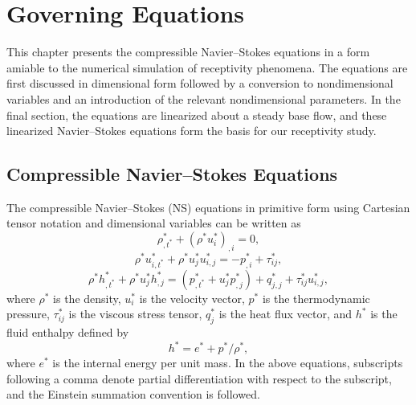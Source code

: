 %
%
%
%
%
\chapter{Governing Equations \label{c:eqn}}

This chapter presents the compressible Navier--Stokes equations in a form
amiable to the numerical simulation of receptivity phenomena.  The equations
are first discussed in dimensional form followed by a conversion to
nondimensional variables and an introduction of the relevant nondimensional
parameters.  In the final section, the equations are linearized about a steady
base flow, and these linearized Navier--Stokes equations form the basis for our
receptivity study.

\section{Compressible Navier--Stokes Equations \label{s:deqn}}

The compressible Navier--Stokes (NS) equations in primitive form using
Cartesian tensor notation and dimensional variables can be written as
%
  \begin{equation} \label{e:dcon}
    \rho^*_{,t^*} + \left(\rho^* u^*_i \right)_{,i} = 0 ,
  \end{equation}
  \begin{equation} \label{e:dmom}
    \rho^* u^*_{i,t^*} + \rho^* u^*_{j} u^*_{i,j} =  -p^*_{,i} + \tau^*_{ij} ,
  \end{equation}
  \begin{equation} \label{e:deng}
    \rho^* h^*_{,t^*} + \rho^* u^*_{j} h^*_{,j} =
    \left( p^*_{,t^*} + u^*_{j} p^*_{,j} \right) + 
    q^*_{j,j} + \tau^*_{ij} u^*_{i,j} ,
  \end{equation}
%
where $\rho^*$ is the density, $u^*_i$ is the velocity vector, $p^*$ is the
thermodynamic pressure, $\tau^*_{ij}$ is the viscous stress tensor, $q^*_{j}$
is the heat flux vector, and $h^*$ is the fluid enthalpy defined by
%
  \begin{equation} \label{e:denthalpy}
    h^* = e^* + p^* / \rho^* , 
  \end{equation} 
%
where $e^*$ is the internal energy per unit mass.  In the above equations,
subscripts following a comma denote partial differentiation with respect to
the subscript, and the Einstein summation convention is followed.

